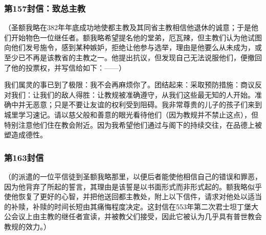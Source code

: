 
\subsubsection{第157封信：致总主教}

（圣额我略在382年年底成功地使都主教及其同省主教相信他退休的诚意；于是他们开始物色一位继任者。额我略希望提名他的堂弟，厄瓦辣，但主教们认为他试图向他们发号施令，感到某种嫉妒，拒绝让他参与选举，理由是他要么从未成为，或至少已不再是该教省的主教之一。他提出抗议，但发现自己无法说服他们，便撤回了他的投票权，并写信给如下：——）\par

我们属灵的事已到了极限：我不会再麻烦你了。团结起来：采取预防措施：商议反对我们：让我们的敌人得胜：让教规被准确遵守，从我们这些最无知的人开始。准确中并无恶意；只是不要让友谊的权利受到阻碍。我非常尊贵的儿子的孩子们来到城里学习速记。请以慈父般和善意的眼光看待他们（因为教规并不禁止这点），但特别注意他们住在教会附近。因为我希望他们通过与阁下的持续交往，在品德上被塑造成德性。\par


\subsubsection{第163封信}

（的派遣的一位平信徒到圣额我略那里，以便后者能使他相信自己的错误和罪恶，因为他背弃了所起的誓言，其理由是该誓是以书面形式而非形式起的。额我略似乎使他恢复了更好的心智，并把他送回都主教处，附上以下信件，请求对他处以适当的补赎，补赎的时间长短由其痛悔程度决定。这封信在553年第二次君士坦丁堡大公会议上由主教的继任者宣读，并被教父们接受，因此它被认为几乎具有普世教会教规的效力。）\par

